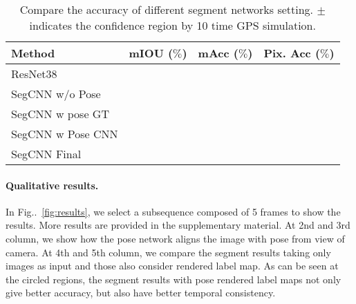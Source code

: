 \documentclass[10pt,twocolumn,letterpaper]{article}
\makeatletter
\newcommand{\figref}[1]{Fig\onedot~\ref{#1}}
\DeclareRobustCommand\onedot{\futurelet\@let@token\@onedot}
\def\onedot{\ifx\@let@token.\else.\null\fi\xspace}
\makeatother
\begin{document}
\begin{table}[t]
\center
\small
\begin{tabular}{lccc}
\toprule[0.1 em]
Method &  mIOU ($\%$) & mAcc ($\%$) & Pix. Acc ($\%$)\\
\hline 
ResNet38~\cite{WuSH16e} & & &  \\
SegCNN w/o Pose & & & \\
SegCNN w pose GT & & & \\
SegCNN w Pose CNN & & & \\
SegCNN Final & & & \\
\toprule[0.1 em]
\end{tabular}
\caption{Compare the accuracy of different segment networks setting. $\pm$ indicates the confidence region by 10 time GPS simulation.}
\label{tbl:segment}
\vspace{-0.3\baselineskip}
\end{table}

\paragraph{Qualitative results.} In \figref{fig:results}, we select a subsequence composed of 5 frames to show the results. More results are provided in the supplementary material. At 2nd and 3rd column, we show how the pose network aligns the image with pose from view of camera. At 4th and 5th column, we compare the segment results taking only images as input and those also consider rendered label map. As can be seen at the circled regions, the segment results with pose rendered label maps not only give better accuracy, but also have better temporal consistency.
\begin{figure*}[t]
\fbox{\rule{0pt}{2in} \rule{.9\linewidth}{0pt}}
   \caption{Results from each intermediate stage out of the system.}
\label{fig:results}
\end{figure*}
\end{document}
